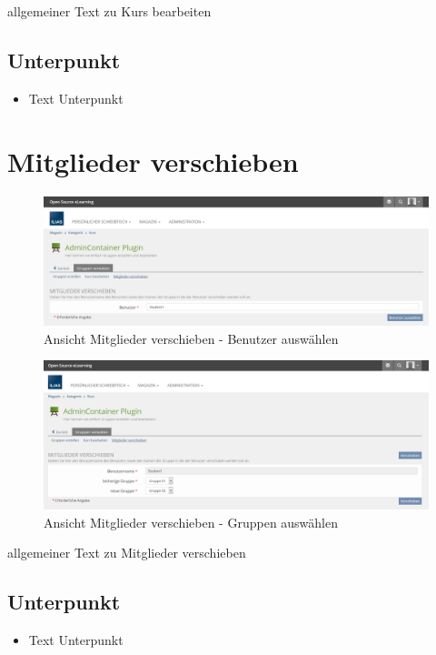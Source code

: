 allgemeiner Text zu Kurs bearbeiten
\subsection*{Unterpunkt}
\begin{itemize}
	\item Text Unterpunkt
\end{itemize}

\clearpage

\section{Mitglieder verschieben}
\begin{figure}
	\centering
	\includegraphics[width=1\textwidth]{img/mitgliederVerschieben1.png}
	\caption{Ansicht Mitglieder verschieben - Benutzer auswählen}
\end{figure}
\begin{figure}
	\centering
	\includegraphics[width=1\textwidth]{img/mitgliederVerschieben2.png}
	\caption{Ansicht Mitglieder verschieben - Gruppen auswählen}
\end{figure}

allgemeiner Text zu Mitglieder verschieben
\subsection*{Unterpunkt}
\begin{itemize}
	\item Text Unterpunkt
\end{itemize}

\clearpage